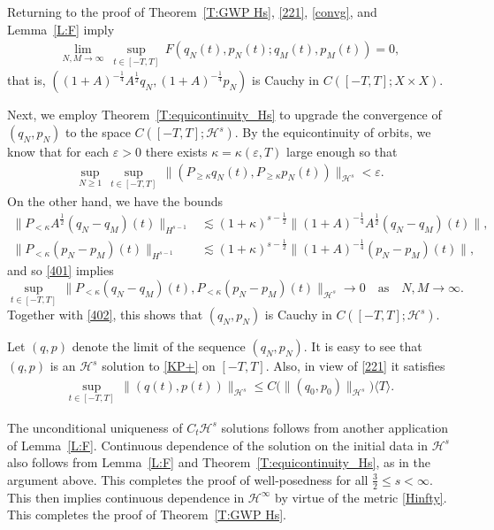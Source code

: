 \documentclass{amsart}
\newcommand{\qtq}[1]{\quad\text{#1}\quad}
\newcommand{\eps}{\varepsilon}
\theoremstyle{definition}
\numberwithin{equation}{section}
\renewcommand{\H}{\mathcal H}
\newcommand{\la}{\langle}
\newcommand{\ra}{\rangle}
\begin{document}
Returning to the proof of Theorem~\ref{T:GWP Hs}, \eqref{221}, \eqref{convg}, and Lemma~\ref{L:F} imply
\begin{align}\label{401}
\lim_{N,M\to\infty}\ \sup_{t\in[-T,T]}\, F(q_N(t),p_N(t); q_M(t), p_M(t)) =0,
\end{align}
that is, $( (1+A)^{-\frac14}A^{\frac12}q_N, (1+A)^{-\frac14}p_N)$ is Cauchy in $C([-T,T]; X\times X)$.

Next, we employ Theorem~\ref{T:equicontinuity_Hs} to upgrade the convergence of $(q_N, p_N)$ to the space $C([-T,T]; \H^s)$. By the equicontinuity of orbits, we know that for each $\eps>0$ there exists $\kappa=\kappa(\eps,T)$  large enough so that
\begin{align}\label{402}
\sup_{N\geq 1} \, \sup_{t\in [-T,T]}\, \|(P_{\geq \kappa} q_N(t), P_{\geq \kappa} p_N(t))\|_{\H^s}<\eps.
\end{align}
On the other hand, we have the bounds
\begin{align*}
\|P_{<\kappa}A^{\frac12}(q_N -q_M)(t)\|_{H^{s-1}} &\lesssim  (1+\kappa)^{s-\frac12}\|(1+A)^{-\frac14}A^{\frac12}(q_N-q_M)(t)\|, \\
\|P_{<\kappa}(p_N -p_M)(t)\|_{H^{s-1}} &\lesssim  (1+\kappa)^{s-\frac12}\|(1+A)^{-\frac14}(p_N-p_M)(t)\|,
\end{align*}
and so \eqref{401} implies
$$
\sup_{t\in [-T,T]}\, \|P_{<\kappa}(q_N -q_M)(t), P_{<\kappa}(p_N -p_M)(t)\|_{\H^s}\to 0 \qtq{as} N, M\to \infty.
$$
Together with \eqref{402}, this shows that $(q_N, p_N)$ is Cauchy in $C([-T,T]; \H^s)$.

Let $(q,p)$ denote the limit of the sequence $(q_N, p_N)$.  It is easy to see that $(q,p)$ is an $\H^s$ solution to \eqref{KP+} on $[-T,T]$.  Also, in view of \eqref{221} it satisfies
\begin{align*}
\sup_{t\in [-T,T]} \,\|(q(t),p(t))\|_{\H^s} \leq C\bigl(\|(q_0,p_0)\|_{\H^s}\bigr)\la T\ra.
\end{align*}

The unconditional uniqueness of $C_t\H^s$ solutions follows from another application of Lemma~\ref{L:F}. Continuous dependence of the solution on the initial data in $\H^s$ also follows from Lemma~\ref{L:F} and Theorem~\ref{T:equicontinuity_Hs}, as in the argument above.  This completes the proof of well-posedness for all $\frac32\leq s< \infty$.  This then implies continuous dependence in $\H^\infty$ by virtue of the metric \eqref{Hinfty}. This completes the proof of Theorem~\ref{T:GWP Hs}.
\end{document}
